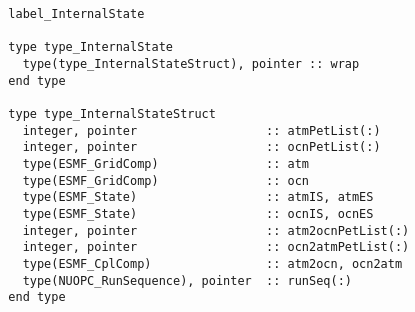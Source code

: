 \begin{verbatim}  label_InternalState

  type type_InternalState
    type(type_InternalStateStruct), pointer :: wrap
  end type

  type type_InternalStateStruct
    integer, pointer                  :: atmPetList(:)
    integer, pointer                  :: ocnPetList(:)
    type(ESMF_GridComp)               :: atm
    type(ESMF_GridComp)               :: ocn
    type(ESMF_State)                  :: atmIS, atmES
    type(ESMF_State)                  :: ocnIS, ocnES
    integer, pointer                  :: atm2ocnPetList(:)
    integer, pointer                  :: ocn2atmPetList(:)
    type(ESMF_CplComp)                :: atm2ocn, ocn2atm
    type(NUOPC_RunSequence), pointer  :: runSeq(:)
  end type

\end{verbatim}

